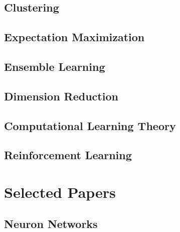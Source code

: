 \documentclass[a4paper]{book}
\theoremstyle{nonumberplain} %
\begin{document}
\chapter{Clustering}


\chapter{Expectation Maximization}


\chapter{Ensemble Learning}


\chapter{Dimension Reduction}


\chapter{Computational Learning Theory}


\chapter{Reinforcement Learning}


\part{Selected Papers}

\chapter{Neuron Networks}



\backmatter


\end{document}
